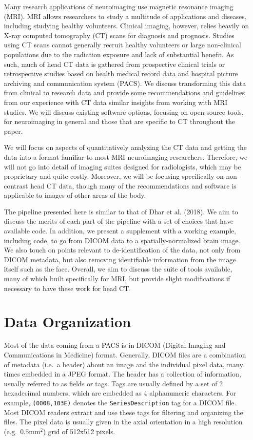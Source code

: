 \documentclass[utf8]{frontiersSCNS}
\begin{document}
Many research applications of neuroimaging use magnetic resonance imaging (MRI). MRI allows researchers to study a multitude of applications and diseases, including studying healthy volunteers. Clinical imaging, however, relies heavily on X-ray computed tomography (CT) scans for diagnosis and prognosis. Studies using CT scans cannot generally recruit healthy volunteers or large non-clinical populations due to the radiation exposure and lack of substantial benefit. As such, much of head CT data is gathered from prospective clinical trials or retrospective studies based on health medical record data and hospital picture archiving and communication system (PACS). We discuss transforming this data from clinical to research data and provide some recommendations and guidelines from our experience with CT data similar insights from working with MRI studies. We will discuss existing software options, focusing on open-source tools, for neuroimaging in general and those that are specific to CT throughout the paper.

We will focus on aspects of quantitatively analyzing the CT data and getting the data into a format familiar to most MRI neuroimaging researchers. Therefore, we will not go into detail of imaging suites designed for radiologists, which may be proprietary and quite costly. Moreover, we will be focusing specifically on non-contrast head CT data, though many of the recommendations and software is applicable to images of other areas of the body.

The pipeline presented here is similar to that of Dhar et al. (2018). We aim to discuss the merits of each part of the pipeline with a set of choices that have available code. In addition, we present a supplement with a working example, including code, to go from DICOM data to a spatially-normalized brain image. We also touch on points relevant to de-identification of the data, not only from DICOM metadata, but also removing identifiable information from the image itself such as the face. Overall, we aim to discuss the suite of tools available, many of which built specifically for MRI, but provide slight modifications if necessary to have these work for head CT.

\hypertarget{data-organization}{%
\section{Data Organization}\label{data-organization}}

Most of the data coming from a PACS is in DICOM (Digital Imaging and Communications in Medicine) format. Generally, DICOM files are a combination of metadata (i.e.~a header) about an image and the individual pixel data, many times embedded in a JPEG format. The header has a collection of information, usually referred to as fields or tags. Tags are usually defined by a set of 2 hexadecimal numbers, which are embedded as 4 alphanumeric characters. For example, \texttt{(0008,103E)} denotes the \texttt{SeriesDescription} tag for a DICOM file. Most DICOM readers extract and use these tags for filtering and organizing the files. The pixel data is usually given in the axial orientation in a high resolution (e.g.~\(0.5\)mm\(^2\)) grid of 512x512 pixels.
\end{document}
